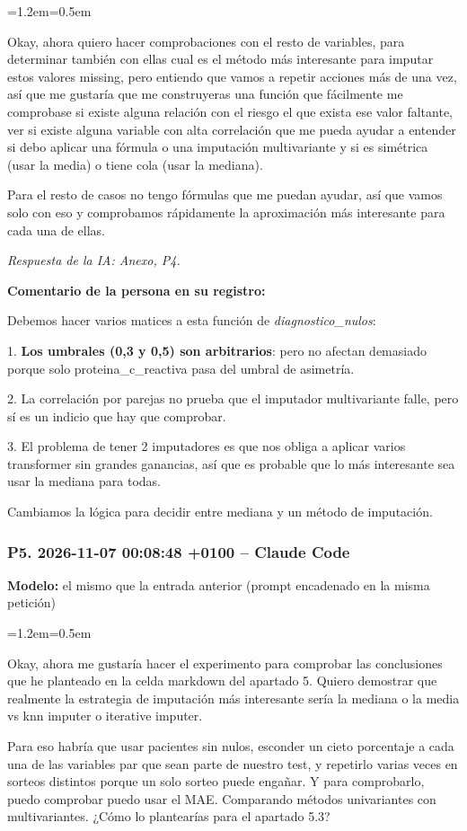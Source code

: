 \documentclass[11pt,a4paper]{article}
\newenvironment{prompt}
  {\par\smallskip\begin{list}{}{\leftmargin=1.2em\rightmargin=0.5em}\item\relax\small\color{black!80}}
  {\end{list}\smallskip}
\begin{document}
\begin{prompt}
Okay, ahora quiero hacer comprobaciones con el resto de variables, para determinar también con ellas cual es el método más interesante para imputar estos valores missing, pero entiendo que vamos a repetir acciones más de una vez, así que me gustaría que me construyeras una función que fácilmente me comprobase si existe alguna relación con el riesgo el que exista ese valor faltante, ver si existe alguna variable con alta correlación que me pueda ayudar a entender si debo aplicar una fórmula o una imputación multivariante y si es simétrica (usar la media) o tiene cola (usar la mediana).

Para el resto de casos no tengo fórmulas que me puedan ayudar, así que vamos solo con eso y comprobamos rápidamente la aproximación más interesante para cada una de ellas.
\end{prompt}

\textit{Respuesta de la IA: Anexo, P4.}

\textbf{Comentario de la persona en su registro:}

Debemos hacer varios matices a esta función de \textit{diagnostico\_\allowbreak{}nulos}:

1. \textbf{Los umbrales (0,3 y 0,5) son arbitrarios}: pero no afectan demasiado porque solo proteina\_\allowbreak{}c\_\allowbreak{}reactiva pasa del umbral de asimetría.

2. La correlación por parejas no prueba que el imputador multivariante falle, pero sí es un indicio que hay que comprobar.

3. El problema de tener 2 imputadores es que nos obliga a aplicar varios transformer sin grandes ganancias, así que es probable que lo más interesante sea usar la mediana para todas.

Cambiamos la lógica para decidir entre mediana y un método de imputación.

\subsubsection*{P5. 2026-11-07 00:08:48 +0100 -- Claude Code}
\textbf{Modelo:} el mismo que la entrada anterior (prompt encadenado en la misma petición)

\begin{prompt}
Okay, ahora me gustaría hacer el experimento para comprobar las conclusiones que he planteado en la celda markdown del apartado 5. Quiero demostrar que realmente la estrategia de imputación más interesante sería la mediana o la media vs knn imputer o iterative imputer.

Para eso habría que usar pacientes sin nulos, esconder un cieto porcentaje a cada una de las variables par que sean parte de nuestro test, y repetirlo varias veces en sorteos distintos  porque un solo sorteo puede engañar. Y para comprobarlo, puedo comprobar puedo usar el MAE. Comparando métodos univariantes con multivariantes. ¿Cómo lo plantearías para el apartado 5.3?
\end{prompt}
\end{document}
